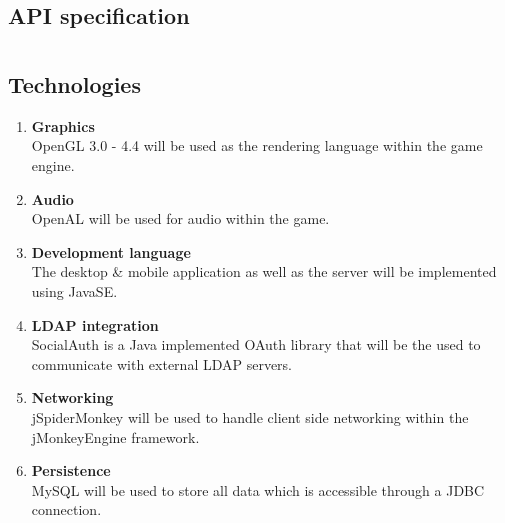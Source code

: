 \documentclass[letterpaper]{article}
\begin{document}
			\vspace{0.2in}
			\subsection*{API specification}
			\vspace{0.1in}
		
		
		
		\vspace{0.2in}
		
		
		\section*{\colorbox{blue}{}} 
		\vspace{0.1in}
		
			\subsection*{Technologies}
			\vspace{0.1in}
			
				\begin{enumerate}					
					\item \textbf{Graphics}
					\\OpenGL 3.0 - 4.4 will be used as the rendering language within the game engine.
					
					\item \textbf{Audio}
					\\OpenAL will be used for audio within the game.
					
					\item \textbf{Development language}
					\\The desktop \& mobile application as well as the server will be implemented using JavaSE.
					
					\item \textbf{LDAP integration}
					\\SocialAuth is a Java implemented OAuth library that will be the used to communicate with external LDAP servers.
					
					\item \textbf{Networking}
					\\jSpiderMonkey will be used to handle client side networking within the jMonkeyEngine framework.
					
					\item \textbf{Persistence}
					\\MySQL will be used to store all data which is accessible through a JDBC connection.
				\end{enumerate}
				
\end{document}
